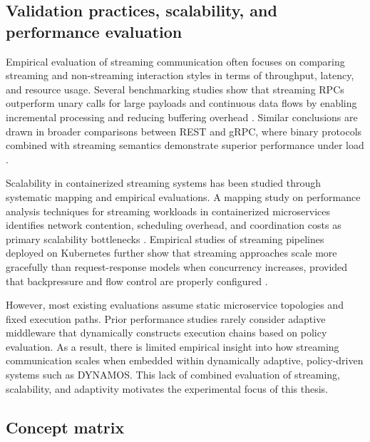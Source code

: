 \documentclass[a4paper,10pt,british]{scrartcl}
\begin{document}
\subsection{Validation practices, scalability, and performance evaluation}

Empirical evaluation of streaming communication often focuses on comparing streaming and non-streaming interaction styles in terms of throughput, latency, and resource usage. Several benchmarking studies show that streaming RPCs outperform unary calls for large payloads and continuous data flows by enabling incremental processing and reducing buffering overhead \cite{sodankoor2026grpcbench}. Similar conclusions are drawn in broader comparisons between REST and gRPC, where binary protocols combined with streaming semantics demonstrate superior performance under load \cite{restgrpccomparison, lahtevenoja2021communication}.

Scalability in containerized streaming systems has been studied through systematic mapping and empirical evaluations. A mapping study on performance analysis techniques for streaming workloads in containerized microservices identifies network contention, scheduling overhead, and coordination costs as primary scalability bottlenecks \cite{systematicstreaming}. Empirical studies of streaming pipelines deployed on Kubernetes further show that streaming approaches scale more gracefully than request-response models when concurrency increases, provided that backpressure and flow control are properly configured \cite{starck2023streaminglb}.

However, most existing evaluations assume static microservice topologies and fixed execution paths. Prior performance studies rarely consider adaptive middleware that dynamically constructs execution chains based on policy evaluation. As a result, there is limited empirical insight into how streaming communication scales when embedded within dynamically adaptive, policy-driven systems such as DYNAMOS. This lack of combined evaluation of streaming, scalability, and adaptivity motivates the experimental focus of this thesis.

\subsection{Concept matrix}
\end{document}
